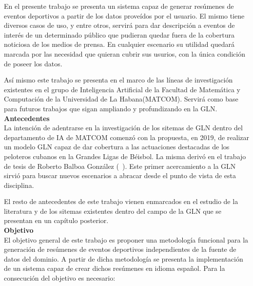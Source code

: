     En el presente trabajo se presenta un sistema capaz de generar resúmenes de eventos deportivos a partir de los datos prove\'idos por 
el usuario. El mismo tiene diversos casos de uso, y entre otros, servirá para dar descripción a eventos de interés de un 
determinado público que pudieran quedar fuera de la cobertura noticiosa de los medios de prensa. En cualquier escenario su utilidad quedará 
marcada por las necesidad que quieran cubrir sus usurios, con la única condición de poseer los datos.

    Así mismo este trabajo se presenta en el marco de las líneas de investigación existentes en el grupo de Inteligencia Artificial de la 
Facultad de Matemática y Computación de la Universidad de La Habana(MATCOM). Servirá como base para futuros trabajos que sigan ampliando y 
profundizando en la GLN.\\


    \textbf{Antecedentes}\\

    La intención de adentrarse en la investigación de los sitemas de GLN dentro del departamento de IA de MATCOM comenzó con la propuesta, en 2019, 
de realizar un modelo GLN capaz de dar cobertura a las actuaciones destacadas de los peloteros cubanos en la Grandes Ligas de Béisbol. La misma derivó 
en el trabajo de tesis de Roberto Balboa González (~\cite{balboa2020}). Este primer acercamiento a la GLN sirvió para buscar nuevos escenarios a abracar 
desde el punto de vista de esta disciplina.

    El resto de antecedentes de este trabajo vienen enmarcados en el estudio de la literatura y de los sitemas existentes dentro del campo de la GLN que 
se presentan en un capítulo posterior.\\

    \textbf{Objetivo}\\

    El objetivo general de este trabajo es proponer una metodología funcional para la generación de res\'umenes de eventos deportivos 
independientes de la fuente de datos del dominio. A partir de dicha metodología se presenta la implementación de un sistema capaz de 
crear dichos resúmenes en idioma español. 
    Para la consecución del objetivo es necesario:

